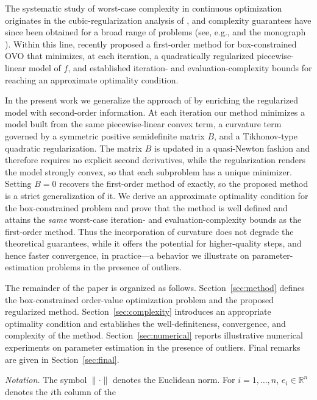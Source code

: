 \documentclass[11pt]{article}
\begin{document}
The systematic study of worst-case complexity in continuous optimization
originates in the cubic-regularization analysis of \cite{nesterov}, and
complexity guarantees have since been obtained for a broad range of problems
(see, e.g., \cite{bgmst2,bgmst1} and the monograph \cite{cogtbook}). Within
this line, \cite{alvarezovo} recently proposed a first-order method for
box-constrained OVO that minimizes, at each iteration, a quadratically
regularized piecewise-linear model of $f$, and established iteration- and
evaluation-complexity bounds for reaching an approximate optimality condition.

In the present work we generalize the approach of \cite{alvarezovo} by
enriching the regularized model with second-order information. At each
iteration our method minimizes a model built from the same piecewise-linear
convex term, a curvature term governed by a symmetric positive semidefinite
matrix $B$, and a Tikhonov-type quadratic regularization. The matrix $B$ is
updated in a quasi-Newton fashion and therefore requires no explicit second
derivatives, while the regularization renders the model strongly convex, so
that each subproblem has a unique minimizer. Setting $B=0$ recovers the
first-order method of \cite{alvarezovo} exactly, so the proposed method is a
strict generalization of it. We derive an approximate optimality condition for
the box-constrained problem and prove that the method is well defined and
attains the \emph{same} worst-case iteration- and evaluation-complexity bounds
as the first-order method. Thus the incorporation of curvature does not degrade
the theoretical guarantees, while it offers the potential for higher-quality
steps, and hence faster convergence, in practice---a behavior we illustrate on
parameter-estimation problems in the presence of outliers.

The remainder of the paper is organized as follows. Section~\ref{sec:method}
defines the box-constrained order-value optimization problem and the proposed
regularized method. Section~\ref{sec:complexity} introduces an appropriate
optimality condition and establishes the well-definiteness, convergence, and
complexity of the method. Section~\ref{sec:numerical} reports illustrative
numerical experiments on parameter estimation in the presence of outliers.
Final remarks are given in Section~\ref{sec:final}.

\medskip
\noindent\textit{Notation.} The symbol $\|\cdot\|$ denotes the Euclidean norm.
For $i=1,\dots,n$, $e_i\in\mathbb{R}^{n}$ denotes the $i$th column of the
\end{document}

